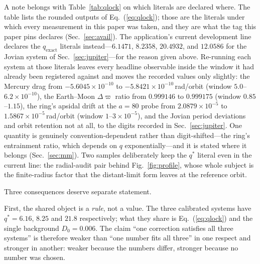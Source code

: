 \documentclass[aps,reprint,amsmath,amssymb,nofootinbib,superscriptaddress,floatfix]{revtex4-2}
\begin{document}
A note belongs with Table~\ref{tab:qlock} on which literals are
declared where.
The table lists the rounded outputs of Eq.~(\ref{eq:qlock}); those are
the literals under which every measurement in this paper was taken, and
they are what the tag this paper pins declares (Sec.~\ref{sec:avail}).
The application's current development line declares the
$q_{\mathrm{exact}}$ literals instead---$6.1471$, $8.2358$, $20.4932$,
and $12.0586$ for the Jovian system of Sec.~\ref{sec:jupiter}---for the
reason given above.
Re-running each system at those literals leaves every headline
observable inside the window it had already been registered against and
moves the recorded values only slightly: the Mercury drag from
$-5.6045\times10^{-10}$ to $-5.8421\times10^{-10}$\,rad/orbit (window
$5.0$--$6.2\times10^{-10}$), the Earth--Moon $\Delta\varpi$ ratio from
$0.999146$ to $0.999175$ (window $0.85$--$1.15$), the ring's apsidal
drift at the $a=80$ probe from $2.0879\times10^{-5}$ to
$1.5867\times10^{-5}$\,rad/orbit (window $1$--$3\times10^{-5}$), and
the Jovian period deviations and orbit retention not at all, to the
digits recorded in Sec.~\ref{sec:jupiter}.
One quantity is genuinely convention-dependent rather than
digit-shifted---the ring's entrainment ratio, which depends on $q$
exponentially---and it is stated where it belongs
(Sec.~\ref{sec:mm}).
Two samples deliberately keep the $q^{*}$ literal even in the current
line: the radial-audit pair behind Fig.~\ref{fig:profile}, whose whole
subject is the finite-radius factor that the distant-limit form leaves
at the reference orbit.

Three consequences deserve separate statement.

First, the shared object is a \emph{rule}, not a value.
The three calibrated systems have $q^{*}=6.16$, $8.25$ and $21.8$
respectively; what they share is Eq.~(\ref{eq:qlock}) and the single
background $D_0=0.006$.
The claim ``one correction satisfies all three systems'' is therefore
weaker than ``one number fits all three'' in one respect and stronger
in another: weaker because the numbers differ, stronger because no
number was chosen.
\end{document}
